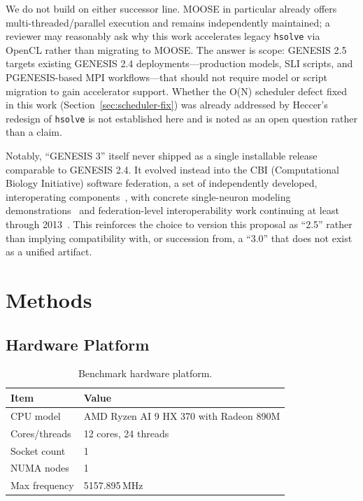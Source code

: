 \documentclass[11pt,a4paper]{article}
\begin{document}
We do not build on either successor line. MOOSE in particular already offers multi-threaded/parallel execution and remains independently maintained; a reviewer may reasonably ask why this work accelerates legacy \texttt{hsolve} via OpenCL rather than migrating to MOOSE. The answer is scope: GENESIS 2.5 targets existing GENESIS 2.4 deployments---production models, SLI scripts, and PGENESIS-based MPI workflows---that should not require model or script migration to gain accelerator support. Whether the O(N) scheduler defect fixed in this work (Section~\ref{sec:scheduler-fix}) was already addressed by Heccer's redesign of \texttt{hsolve} is not established here and is noted as an open question rather than a claim.

Notably, ``GENESIS 3'' itself never shipped as a single installable release comparable to GENESIS 2.4. It evolved instead into the CBI (Computational Biology Initiative) software federation, a set of independently developed, interoperating components~\cite{cornelis2008cbi}, with concrete single-neuron modeling demonstrations~\cite{cornelis2007dendrite} and federation-level interoperability work continuing at least through 2013~\cite{cornelis2013interop}. This reinforces the choice to version this proposal as ``2.5'' rather than implying compatibility with, or succession from, a ``3.0'' that does not exist as a unified artifact.

\section{Methods}

\subsection{Hardware Platform}

\begin{table}[H]
\centering
\caption{Benchmark hardware platform.}
\begin{tabular}{ll}
\toprule
Item & Value \\
\midrule
CPU model & AMD Ryzen AI 9 HX 370 with Radeon 890M \\
Cores/threads & 12 cores, 24 threads \\
Socket count & 1 \\
NUMA nodes & 1 \\
Max frequency & 5157.895\,MHz \\
\bottomrule
\end{tabular}
\end{table}
\end{document}
